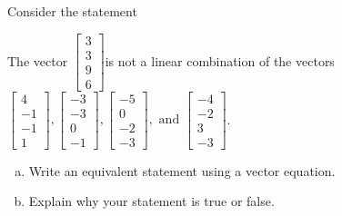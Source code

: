 
\begin{exerciseStatement}


Consider the statement 
\begin{center}\begin{minipage}{0.8\textwidth}
 The vector \( \left[\begin{array}{c}
3 \\
3 \\
9 \\
6
\end{array}\right] \)is not a linear combination of the vectors \( \left[\begin{array}{c}
4 \\
-1 \\
-1 \\
1
\end{array}\right] , \left[\begin{array}{c}
-3 \\
-3 \\
0 \\
-1
\end{array}\right] , \left[\begin{array}{c}
-5 \\
0 \\
-2 \\
-3
\end{array}\right] , \text{ and } \left[\begin{array}{c}
-4 \\
-2 \\
3 \\
-3
\end{array}\right] \). 
\end{minipage}\end{center}
    


\begin{enumerate}[(a)]
\item  Write an equivalent statement using a vector equation.
\item  Explain why your statement is true or false.
\end{enumerate}
    
\end{exerciseStatement}
    
